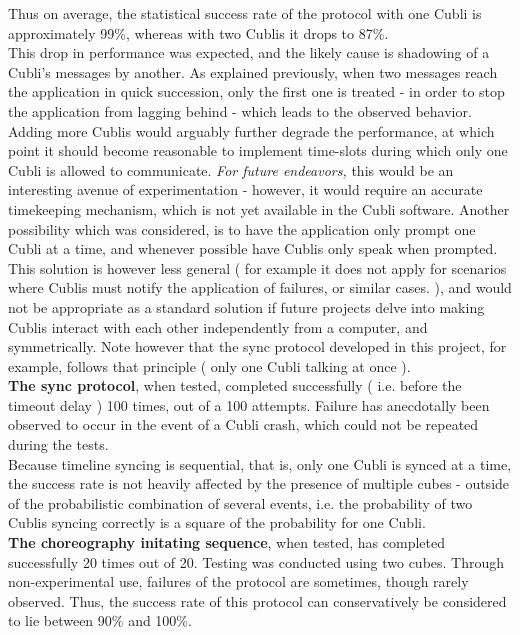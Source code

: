 Thus on average, the statistical success rate of the protocol with one Cubli is approximately 99\%, whereas with two Cublis it drops to 87\%. \\

This drop in performance was expected, and the likely cause is shadowing of a Cubli's messages by another. As explained previously, when two messages reach the application in quick succession, only the first one is treated - in order to stop the application from lagging behind - which leads to the observed behavior. \\

Adding more Cublis would arguably further degrade the performance, at which point it should become reasonable to implement time-slots during which only one Cubli is allowed to communicate. \textit{ For future endeavors, } this would be an interesting avenue of experimentation - however, it would require an accurate timekeeping mechanism, which is not yet available in the Cubli software. Another possibility which was considered, is to have the application only prompt one Cubli at a time, and whenever possible have Cublis only speak when prompted. This solution is however less general ( for example it does not apply for scenarios where Cublis must notify the application of failures, or similar cases. ), and would not be appropriate as a standard solution if future projects delve into making Cublis interact with each other independently from a computer, and symmetrically. Note however that the sync protocol developed in this project, for example, follows that principle ( only one Cubli talking at once ). \\

\textbf{The sync protocol}, when tested, completed successfully ( i.e. before the timeout delay ) 100 times, out of a 100 attempts. Failure has anecdotally been observed to occur in the event of a Cubli crash, which could not be repeated during the tests.\\

Because timeline syncing is sequential, that is, only one Cubli is synced at a time, the success rate is not heavily affected by the presence of multiple cubes - outside of the probabilistic combination of several events, i.e. the probability of two Cublis syncing correctly is a square of the probability for one Cubli.\\

\textbf{The choreography initating sequence}, when tested, has completed successfully 20 times out of 20. Testing was conducted using two cubes. Through non-experimental use, failures of the protocol are sometimes, though rarely observed. Thus, the success rate of this protocol can conservatively be considered to lie between 90\% and 100\%. \\

